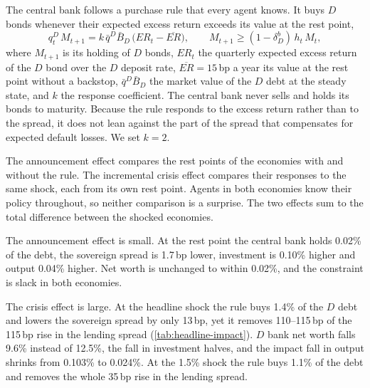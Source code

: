 The central bank follows a purchase rule that every agent knows. It buys $D$ bonds whenever their
expected excess return exceeds its value at the rest point,
\begin{equation}
q^{D}_{t}\,M_{t+1}=k\,\bar q^{D}\bar B_{D}\,\bigl(\mathit{ER}_{t}-\overline{\mathit{ER}}\bigr),
\qquad M_{t+1}\ge(1-\delta^b_D)\,h_t\,M_{t},
\label{eq:proportional-rule}
\end{equation}
where $M_{t+1}$ is its holding of $D$ bonds, $\mathit{ER}_t$ the quarterly expected excess
return of the $D$ bond over the $D$ deposit rate, $\overline{\mathit{ER}}=15$\,bp a year its
value at the rest point without a backstop, $\bar q^{D}\bar B_D$ the market value of the $D$ debt
at the steady state, and $k$ the response coefficient. The central bank never sells and holds its
bonds to maturity. Because the rule responds to the excess return rather than to the spread, it
does not lean against the part of the spread that compensates for expected default losses. We
set $k=2$.

The announcement effect compares the rest points of the economies with and without the rule. The
incremental crisis effect compares their responses to the same shock, each from its own rest
point. Agents in both economies know their policy throughout, so neither comparison is a
surprise. The two effects sum to the total difference between the shocked economies.

The announcement effect is small. At the rest point the central bank holds 0.02\% of the debt,
the sovereign spread is 1.7\,bp lower, investment is 0.10\% higher and output 0.04\% higher. Net
worth is unchanged to within 0.02\%, and the constraint is slack in both economies.

The crisis effect is large. At the headline shock the rule buys 1.4\% of the $D$ debt and lowers
the sovereign spread by only 13\,bp, yet it removes 110--115\,bp of the 115\,bp rise in the
lending spread (\cref{tab:headline-impact}). $D$ bank net worth falls 9.6\% instead of 12.5\%,
the fall in investment halves, and the impact fall in output shrinks from 0.103\% to 0.024\%. At
the 1.5\% shock the rule buys 1.1\% of the debt and removes the whole 35\,bp rise in the lending
spread.

